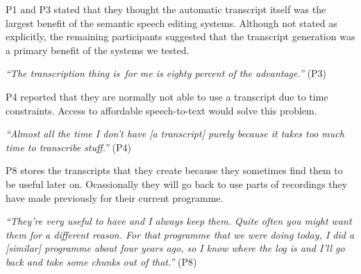 P1 and P3 stated that they thought the automatic transcript itself was the largest benefit of the semantic speech
editing systems.  Although not stated as explicitly, the remaining participants suggested that the transcript
generation was a primary benefit of the systems we tested.

\textit{``The transcription thing is for me is eighty percent of the advantage.''} (P3)

P4 reported that they are normally not able to use a transcript due to time constraints. Access to affordable
speech-to-text would solve this problem.

\textit{``Almost all the time I don't have [a transcript] purely because it takes too much time to transcribe stuff.''}
(P4)

P8 stores the transcripts that they create because they sometimes find them to be useful later on. Ocassionally they
will go back to use parts of recordings they have made previously for their current programme.

\textit{``They're very useful to have and I always keep them. Quite often you might want them for a different reason.
For that programme that we were doing today, I did a [similar] programme about four years ago, so I know where the log
is and I'll go back and take some chunks out of that.''} (P8)












